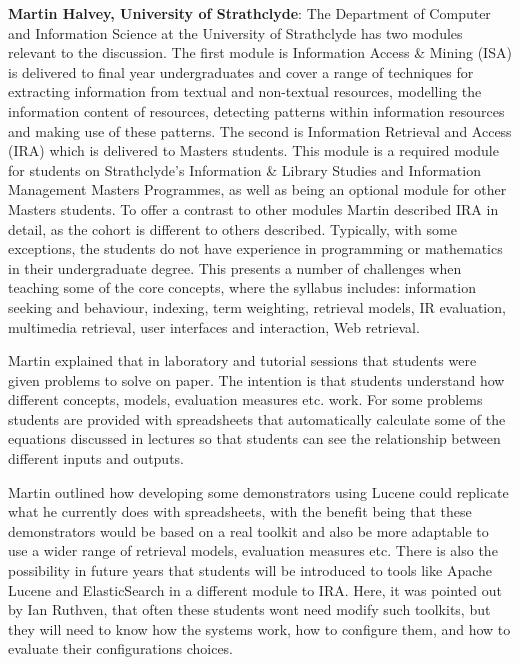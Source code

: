 {\bf Martin Halvey, University of Strathclyde}: The Department of Computer and Information Science at the University of Strathclyde has two modules relevant to the discussion. The first module is Information Access \& Mining (ISA) is delivered to final year undergraduates and cover a range of techniques for extracting information from textual and non-textual resources, modelling the information content of resources, detecting patterns within information resources and making use of these patterns. The second is Information Retrieval and Access (IRA) which is delivered to Masters students. This module is a required module for students on Strathclyde's Information \& Library Studies and Information Management Masters Programmes, as well as being an optional module for other Masters students. To offer a contrast to other modules Martin described IRA in detail, as the cohort is different to others described. Typically, with some exceptions, the students do not have experience in programming or mathematics in their undergraduate degree. This presents a number of challenges when teaching some of the core concepts, where the syllabus includes:
information seeking and behaviour,
indexing,
term weighting,
retrieval models,
IR evaluation,
multimedia retrieval,
user interfaces and interaction,
Web retrieval. 

Martin explained that in laboratory and tutorial sessions that students were given problems to solve on paper. The intention is that students understand how different concepts, models, evaluation measures etc. work. For some problems students are provided with spreadsheets that automatically calculate some of the equations discussed in lectures so that students can see the relationship between different inputs and outputs. 

Martin outlined how developing some demonstrators using Lucene could replicate what he currently does with spreadsheets, with the benefit being that these demonstrators would be based on a real toolkit and also be more adaptable to use a wider range of retrieval models, evaluation measures etc. There is also the possibility in future years that students will be introduced to tools like Apache Lucene and ElasticSearch in a different module to IRA. Here, it was pointed out by Ian Ruthven, that often these students wont need modify such toolkits, but they will need to know how the systems work, how to configure them, and how to evaluate their configurations choices.\\

